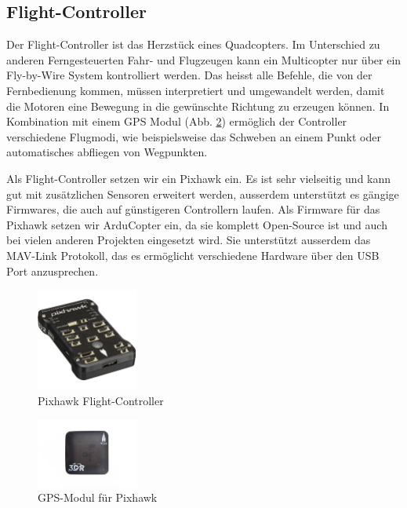 \subsection{Flight-Controller}

Der Flight-Controller ist das Herzstück eines Quadcopters. Im Unterschied zu anderen Ferngesteuerten Fahr- und Flugzeugen kann ein Multicopter nur über ein Fly-by-Wire System kontrolliert werden. Das heisst alle Befehle, die von der Fernbedienung kommen, müssen interpretiert und umgewandelt werden, damit die Motoren eine Bewegung in die gewünschte Richtung zu erzeugen können. In Kombination mit einem GPS Modul (Abb. \ref{fig:gps-module}) ermöglich der Controller verschiedene Flugmodi, wie beispielsweise das Schweben an einem Punkt oder automatisches abfliegen von Wegpunkten.

Als Flight-Controller setzen wir ein Pixhawk ein. Es ist sehr vielseitig und kann gut mit zusätzlichen Sensoren erweitert werden, ausserdem unterstützt es gängige Firmwares, die auch auf günstigeren Controllern laufen. Als Firmware für das Pixhawk setzen wir ArduCopter ein, da sie komplett Open-Source ist und auch bei vielen anderen Projekten eingesetzt wird. Sie unterstützt ausserdem das MAV-Link Protokoll, das es ermöglicht verschiedene Hardware über den USB Port anzusprechen.

\begin{figure}[h]
	\centering
	\includegraphics[width=0.3\textwidth] {images/hardware/pixhawk.jpg} 
	\caption{Pixhawk Flight-Controller}
	\label{fig:pixhawk}
\end{figure}

\begin{figure}[h]
	\centering
	\includegraphics[width=0.3\textwidth] {images/hardware/gps-module.jpg} 
	\caption{GPS-Modul für Pixhawk}
	\label{fig:gps-module}
\end{figure}

